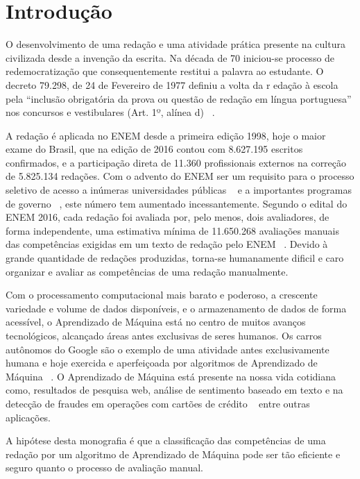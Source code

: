 \section{Introdução}
\noindent O desenvolvimento de uma redação e uma atividade prática presente na 
cultura civilizada desde a invenção da escrita. Na década de 70 iniciou-se 
processo de redemocratização que consequentemente restitui a palavra ao 
estudante. O decreto 79.298, de 24 de Fevereiro de 1977 definiu a volta da r
edação à escola pela ``inclusão obrigatória da prova ou questão de redação em 
língua portuguesa'' nos concursos e vestibulares (Art. 1º, alínea d) 
~\cite{lara:1995}.

A redação é aplicada no ENEM desde a primeira edição 1998, hoje o maior exame 
do Brasil, que na edição de 2016 contou com 8.627.195 escritos confirmados, e a 
participação direta de 11.360 profissionais externos na correção de 5.825.134 
redações. Com o advento do ENEM ser um requisito para o processo seletivo de 
acesso a inúmeras universidades públicas ~\cite{sisu:2017} e a importantes 
programas de governo ~\cite{csf:2017}, este número tem aumentado 
incessantemente. Segundo o edital do ENEM 2016, cada redação foi avaliada por, 
pelo menos, dois avaliadores, de forma independente, uma estimativa mínima de 
11.650.268 avaliações manuais das competências exigidas em um texto de redação 
pelo ENEM ~\cite{edital_enem:2016}. Devido à grande quantidade de redações 
produzidas, torna-se humanamente dificil e caro organizar e avaliar as 
competências de uma redação manualmente.

Com o processamento computacional mais barato e poderoso, a crescente variedade 
e volume de dados disponíveis, e o armazenamento de dados de forma acessível, 
o Aprendizado de Máquina está no centro de muitos avanços tecnológicos, 
alcançado áreas antes exclusivas de seres humanos. Os carros autônomos do 
Google são o exemplo de uma atividade antes exclusivamente humana e hoje 
exercida e aperfeiçoada por algoritmos de Aprendizado de Máquina 
~\cite{waymo:2017}. O Aprendizado de Máquina está presente na nossa vida 
cotidiana como, resultados de pesquisa web, análise de sentimento baseado em 
texto e na detecção de fraudes em operações com cartões de crédito 
~\cite{batista1999aplicando} entre outras aplicações.

A hipótese desta monografia é que a classificação das competências de uma redação por um algoritmo de Aprendizado de Máquina pode ser tão eficiente e seguro quanto o processo de avaliação manual.

